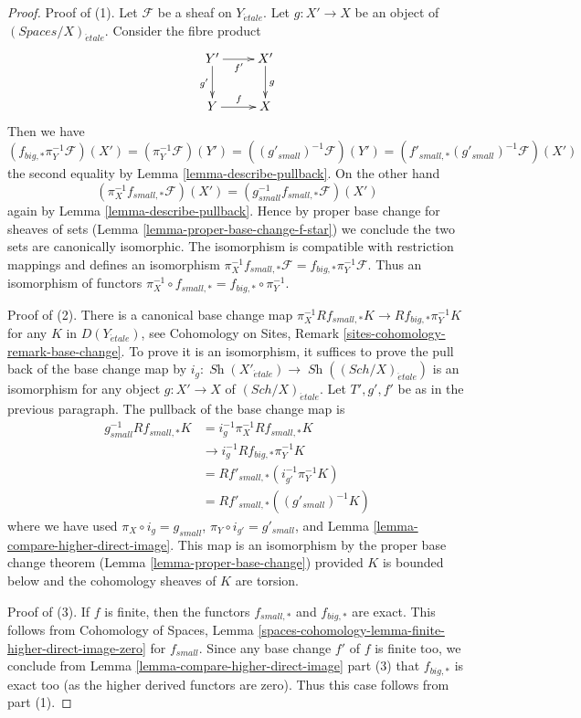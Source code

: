 \documentclass{stacks-project}
\theoremstyle{plain}
\theoremstyle{definition}
\theoremstyle{remark}
\numberwithin{equation}{subsection}
\def\Sch{\mathit{Sch}}
\def\Sh{\mathop{\mathit{Sh}}\nolimits}
\def\etale{{\acute{e}tale}}
\begin{document}
\begin{proof}
Proof of (1). Let $\mathcal{F}$ be a sheaf on $Y_\etale$.
Let $g : X' \to X$ be an object of $(\textit{Spaces}/X)_\etale$.
Consider the fibre product
$$
\xymatrix{
Y' \ar[r]_{f'} \ar[d]_{g'} & X' \ar[d]^g \\
Y \ar[r]^f & X
}
$$
Then we have
$$
(f_{big, *}\pi_Y^{-1}\mathcal{F})(X') =
(\pi_Y^{-1}\mathcal{F})(Y') =
((g'_{small})^{-1}\mathcal{F})(Y')  =
(f'_{small, *}(g'_{small})^{-1}\mathcal{F})(X')
$$
the second equality by Lemma \ref{lemma-describe-pullback}.
On the other hand
$$
(\pi_X^{-1}f_{small, *}\mathcal{F})(X') =
(g_{small}^{-1}f_{small, *}\mathcal{F})(X')
$$
again by Lemma \ref{lemma-describe-pullback}.
Hence by proper base change for sheaves of sets
(Lemma \ref{lemma-proper-base-change-f-star})
we conclude the two sets are canonically isomorphic.
The isomorphism is compatible with restriction mappings
and defines an isomorphism
$\pi_X^{-1}f_{small, *}\mathcal{F} = f_{big, *}\pi_Y^{-1}\mathcal{F}$.
Thus an isomorphism of functors
$\pi_X^{-1} \circ f_{small, *} = f_{big, *} \circ \pi_Y^{-1}$.

\medskip\noindent
Proof of (2). There is a canonical base change map
$\pi_X^{-1}Rf_{small, *}K \to Rf_{big, *}\pi_Y^{-1}K$
for any $K$ in $D(Y_\etale)$, see
Cohomology on Sites, Remark \ref{sites-cohomology-remark-base-change}.
To prove it is an isomorphism, it suffices to prove the pull back of
the base change map by $i_g : \Sh(X'_\etale) \to \Sh((\Sch/X)_\etale)$
is an isomorphism for any object $g : X' \to X$ of $(\Sch/X)_\etale$.
Let $T', g', f'$ be as in the previous paragraph.
The pullback of the base change map is
\begin{align*}
g_{small}^{-1}Rf_{small, *}K
& =
i_g^{-1}\pi_X^{-1}Rf_{small, *}K \\
& \to
i_g^{-1}Rf_{big, *}\pi_Y^{-1}K \\
& =
Rf'_{small, *}(i_{g'}^{-1}\pi_Y^{-1}K) \\
& =
Rf'_{small, *}((g'_{small})^{-1}K)
\end{align*}
where we have used $\pi_X \circ i_g = g_{small}$,
$\pi_Y \circ i_{g'} = g'_{small}$, and
Lemma \ref{lemma-compare-higher-direct-image}.
This map is an isomorphism by the proper base change theorem
(Lemma \ref{lemma-proper-base-change}) provided $K$ is bounded
below and the cohomology sheaves of $K$ are torsion.

\medskip\noindent
Proof of (3). If $f$ is finite, then the functors
$f_{small, *}$ and $f_{big, *}$ are exact. This follows
from Cohomology of Spaces, Lemma
\ref{spaces-cohomology-lemma-finite-higher-direct-image-zero}
for $f_{small}$. Since any base change $f'$ of $f$ is finite too,
we conclude from Lemma \ref{lemma-compare-higher-direct-image} part (3)
that $f_{big, *}$ is exact too (as the higher derived functors are zero).
Thus this case follows from part (1).
\end{proof}
\end{document}
